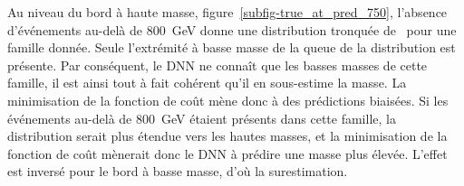 \par
Au niveau du bord à haute masse,
figure~\ref{subfig-true_at_pred_750},
l'absence d'événements au-delà de \SI{800}{\GeV} donne une distribution tronquée de \ytrue\ pour une famille donnée.
Seule l'extrémité à basse masse de la queue de la distribution est présente.
Par conséquent,
le DNN ne connaît que les basses masses de cette famille,
il est ainsi tout à fait cohérent qu'il en sous-estime la masse.
La minimisation de la fonction de coût mène donc à des prédictions biaisées.
Si les événements au-delà de \SI{800}{\GeV} étaient présents dans cette famille,
la distribution serait plus étendue vers les hautes masses,
et la minimisation de la fonction de coût mènerait donc le DNN à prédire une masse plus élevée.
L'effet est inversé pour le bord à basse masse, d'où la surestimation.
